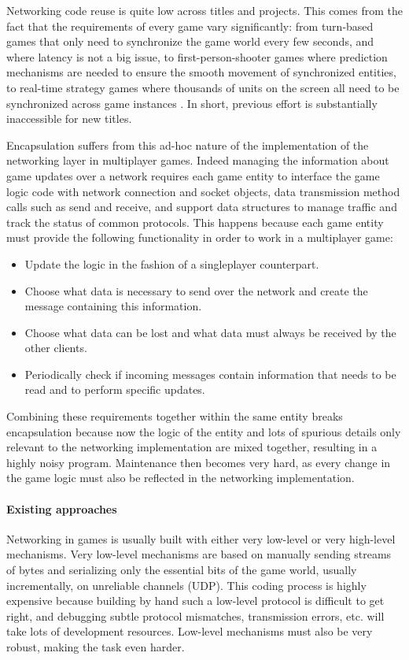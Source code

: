 Networking code reuse is quite low across titles and projects. This comes from the fact that the requirements of every game vary significantly: from turn-based games that only need to synchronize the game world every few seconds, and where latency is not a big issue, to first-person-shooter games where prediction mechanisms are needed to ensure the smooth movement of synchronized entities, to real-time strategy games where thousands of units on the screen all need to be synchronized across game instances \cite{smed2002aspects}. In short, previous effort is substantially inaccessible for new titles. 

Encapsulation suffers from this ad-hoc nature of the implementation of the networking layer in multiplayer games. Indeed managing the information about game updates over a network requires each game entity to interface the game logic code with network connection and socket objects, data transmission method calls such as send and receive, and support data structures to manage traffic and track the status of common protocols. This happens because each game entity must provide the following functionality in order to work in a multiplayer game:

\begin{itemize}
	\item Update the logic in the fashion of a singleplayer counterpart.
	\item Choose what data is necessary to send over the network and create the message containing this information.
	\item Choose what data can be lost and what data must always be received by the other clients.
	\item Periodically check if incoming messages contain information that needs to be read and to perform specific updates.
\end{itemize}

Combining these requirements together within the same entity breaks encapsulation because now the logic of the entity and lots of spurious details only relevant to the networking implementation are mixed together, resulting in a highly noisy program. Maintenance then becomes very hard, as every change in the game logic must also be reflected in the networking implementation.

\paragraph{Existing approaches}
Networking in games is usually built with either very low-level or very high-level mechanisms. Very low-level mechanisms are based on manually sending streams of bytes and serializing only the essential bits of the game world, usually incrementally, on unreliable channels (UDP). This coding process is highly expensive because building by hand such a low-level protocol is difficult to get right, and debugging subtle protocol mismatches, transmission errors, etc. will take lots of development resources. Low-level mechanisms must also be very robust, making the task even harder.

